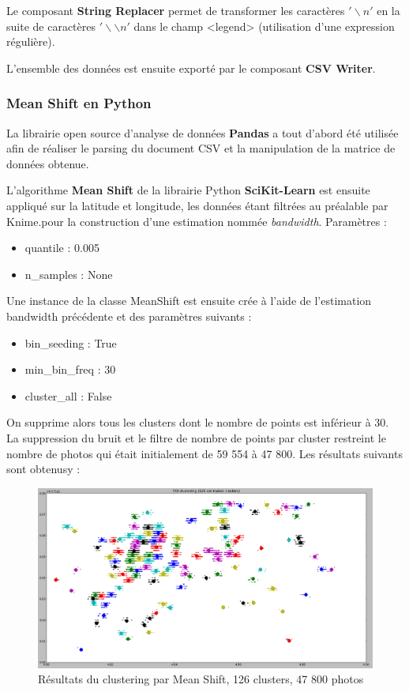 Le composant \textbf{String Replacer} permet de transformer les caractères $'\backslash n'$ en la suite de caractères $'\backslash \backslash n'$ dans le champ <legend> (utilisation d'une expression régulière).

L'ensemble des données est ensuite exporté par le composant \textbf{CSV Writer}.

\subsubsection{Mean Shift en Python}
La librairie open source d'analyse de données \textbf{Pandas} a tout d'abord été utilisée afin de réaliser le parsing du document CSV et la manipulation de la matrice de données obtenue.

L'algorithme \textbf{Mean Shift} de la librairie Python \textbf{SciKit-Learn} est ensuite appliqué sur la latitude et longitude, les données étant filtrées au préalable par Knime.pour la construction d'une estimation nommée \textit{bandwidth}. Paramètres :
\begin{itemize}
    \item quantile : 0.005
    \item n\_samples : None
\end{itemize}

Une instance de la classe MeanShift est ensuite crée à l'aide de l'estimation bandwidth précédente et des paramètres suivants :
\begin{itemize}
    \item bin\_seeding : True
    \item min\_bin\_freq : 30
    \item cluster\_all : False
\end{itemize}

On supprime alors tous les clusters dont le nombre de points est inférieur à 30. La suppression du bruit et le filtre de nombre de points par cluster restreint le nombre de photos qui était initialement de 59 554 à 47 800.
Les résultats suivants sont obtenusy :
\begin{figure}[H]
    \centering
    \includegraphics[width=\linewidth]{img/meanshift.png}
    \caption{Résultats du clustering par Mean Shift, 126 clusters, 47 800 photos}
\end{figure}

